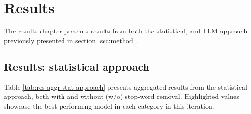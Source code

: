 \section{Results}
\label{sec:results}

The results chapter presents results from both the statistical, and LLM approach previously presented in section \ref{sec:method}.

\subsection{Results: statistical approach}
\label{subsec:results-stat-appoach}

Table \ref{tab:res-aggr-stat-approach} presents aggregated results from the statistical approach, both with and without (w/o) stop-word removal. Highlighted values showcase the best performing model in each category in this iteration.

\begin{table}[ht]
\centering
{}
\caption{Aggregated results from both statistical approaches. Models in \textit{italic} showcase results with stop-words removed.}
\label{tab:res-aggr-stat-approach}
\end{table}


